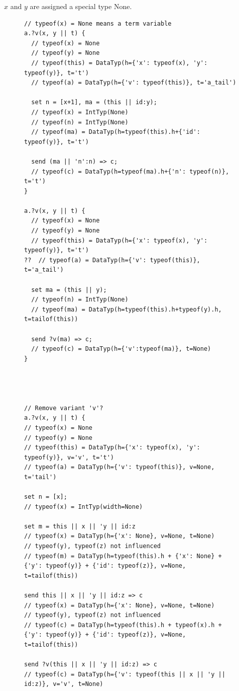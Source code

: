 $x$ and $y$ are assigned a special type None.
\begin{figure}[h!]
\begin{lstlisting}
// typeof(x) = None means a term variable
a.?v(x, y || t) {
  // typeof(x) = None
  // typeof(y) = None
  // typeof(this) = DataTyp(h={'x': typeof(x), 'y': typeof(y)}, t='t')
  // typeof(a) = DataTyp(h={'v': typeof(this)}, t='a_tail')

  set n = [x+1], ma = (this || id:y);
  // typeof(x) = IntTyp(None)
  // typeof(n) = IntTyp(None)
  // typeof(ma) = DataTyp(h=typeof(this).h+{'id': typeof(y)}, t='t')

  send (ma || 'n':n) => c;
  // typeof(c) = DataTyp(h=typeof(ma).h+{'n': typeof(n)}, t='t')
}

a.?v(x, y || t) {
  // typeof(x) = None
  // typeof(y) = None
  // typeof(this) = DataTyp(h={'x': typeof(x), 'y': typeof(y)}, t='t')
??  // typeof(a) = DataTyp(h={'v': typeof(this)}, t='a_tail')

  set ma = (this || y);
  // typeof(n) = IntTyp(None)
  // typeof(ma) = DataTyp(h=typeof(this).h+typeof(y).h, t=tailof(this))

  send ?v(ma) => c;
  // typeof(c) = DataTyp(h={'v':typeof(ma)}, t=None)
}




// Remove variant 'v'?
a.?v(x, y || t) {
// typeof(x) = None
// typeof(y) = None
// typeof(this) = DataTyp(h={'x': typeof(x), 'y': typeof(y)}, v='v', t='t')
// typeof(a) = DataTyp(h={'v': typeof(this)}, v=None, t='tail')

set n = [x];
// typeof(x) = IntTyp(width=None)

set m = this || x || 'y || id:z
// typeof(x) = DataTyp(h={'x': None}, v=None, t=None)
// typeof(y), typeof(z) not influenced
// typeof(m) = DataTyp(h=typeof(this).h + {'x': None} + {'y': typeof(y)} + {'id': typeof(z)}, v=None, t=tailof(this))

send this || x || 'y || id:z => c
// typeof(x) = DataTyp(h={'x': None}, v=None, t=None)
// typeof(y), typeof(z) not influenced
// typeof(c) = DataTyp(h=typeof(this).h + typeof(x).h + {'y': typeof(y)} + {'id': typeof(z)}, v=None, t=tailof(this))

send ?v(this || x || 'y || id:z) => c
// typeof(c) = DataTyp(h={'v': typeof(this || x || 'y || id:z)}, v='v', t=None)

\end{lstlisting}
\label{aa}
\end{figure}



